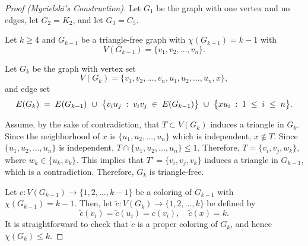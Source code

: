 \begin{proof}[Proof (Mycielski's Construction)]
    Let \(G_1\) be the graph with one vertex and no edges,
    let \(G_2 = K_2\), and let \(G_{3} = C_5\).

    Let \(k \geq 4\) and \(G_{k-1}\) be a triangle-free graph with \(\chi(G_{k-1}) = k-1\) with
    \begin{equation}
        V(G_{k-1}) = \{v_1, v_2, \ldots, v_n\}.
    \end{equation}

    Let \(G_k\) be the graph with vertex set
    \begin{equation}
        V(G_k) = \{v_1, v_2, \ldots, v_n, u_1, u_2, \ldots, u_n, x\},
    \end{equation}
    and edge set
    \begin{equation}
        \thickmuskip=10mu
        \medmuskip=10mu
        E(G_k)
        = E(G_{k-1})
        \cup \big\{v_iu_j : v_iv_j \in E(G_{k-1})\big\}
        \cup \big\{xu_i : 1 \leq i \leq n\big\}.
    \end{equation}

    Assume, by the sake of contradiction, that \(T \subset V(G_k)\) induces a triangle in \(G_k\).
    Since the neighborhood of \(x\) is \(\{u_1, u_2, \ldots, u_n\}\) which is independent, \(x \notin T\).
    Since \(\{u_1, u_2, \ldots, u_n\}\) is independent, \(T \cap \{u_1, u_2, \ldots, u_n\} \leq 1\).
    Therefore, \(T = \{v_i, v_j, w_k\}\), where \(w_k \in \{u_k, v_k\}\).
    This implies that \(T' = \{v_i, v_j, v_k\}\) induces a triangle in \(G_{k-1}\), which is a contradiction.
    Therefore, \(G_k\) is triangle-free.

    Let \(c \colon V(G_{k-1}) \to \{1, 2, \ldots, k-1\}\) be a coloring of \(G_{k-1}\) with \(\chi(G_{k-1}) = k-1\).
    Then, let \(\tilde{c} \colon V(G_k) \to \{1, 2, \ldots, k\}\)
    be defined by
    \begin{equation}
        \tilde{c}(v_i) = \tilde{c}(u_i) = c(v_i),
        \quad
        \tilde{c}(x) = k.
    \end{equation}
    It is straightforward to check that \(\tilde{c}\) is a proper coloring of \(G_k\), and hence \(\chi(G_k) \leq k\).


\end{proof}
